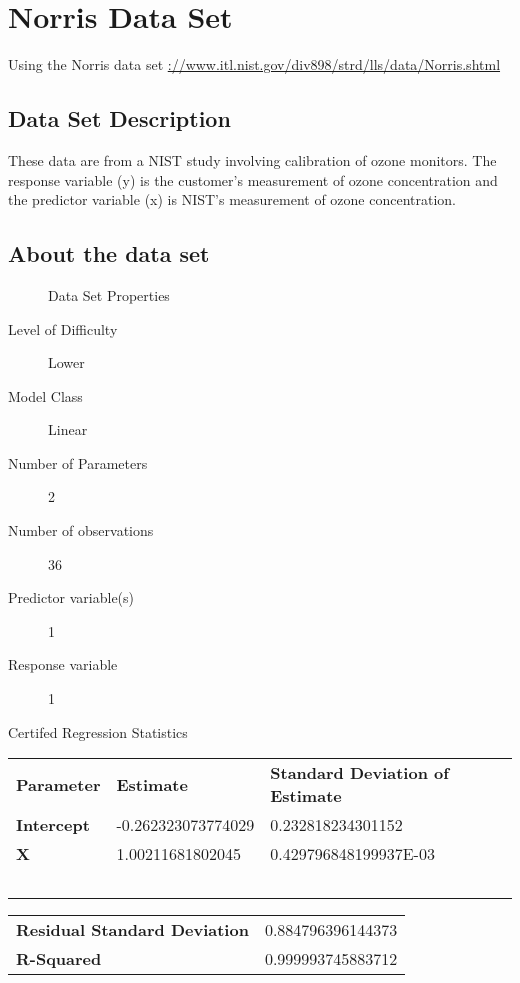 \documentclass[10pt]{article}
\begin{document}
\section{Norris Data Set}
Using the Norris data set \url{://www.itl.nist.gov/div898/strd/lls/data/Norris.shtml}
\subsection*{Data Set Description}

These data are from a NIST study involving calibration of ozone monitors. The 
response variable (y) is the customer's measurement of ozone concentration and 
the predictor variable (x) is NIST's measurement of ozone concentration.  

\subsection*{About the data set}

\begin{description}
   \item[]Data Set Properties
   \item[Level of Difficulty] Lower
   \item[Model Class] Linear
   \item[Number of Parameters] 2   
   \item[Number of observations] 36
   \item[Predictor variable(s)] 1
   \item[Response variable] 1
\end{description}

Certifed Regression Statistics

\begin{tabular}{lll}
   \textbf{Parameter} & \textbf{Estimate} & \textbf{Standard Deviation of Estimate}  \\ 
	\textbf{Intercept} & -0.262323073774029 &  0.232818234301152\\ 
	\textbf{X} & 1.00211681802045  &  0.429796848199937E-03 \\ 
	\ 
\end{tabular} 

\begin{tabular}{ll}
    \textbf{Residual Standard Deviation} &  0.884796396144373  \\ 
	 \textbf{R-Squared} & 0.999993745883712    \\  
\end{tabular}
\end{document}
